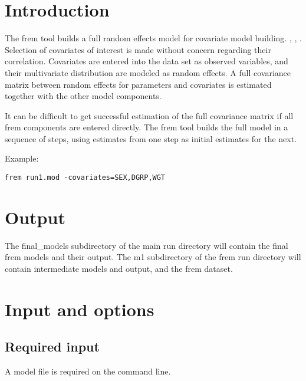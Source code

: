 
\usepackage{amsmath}


\newcommand{\guidetoolname}{frem}

\maketitle

\section{Introduction}
The frem tool builds a full random effects model for covariate model building. \cite{Karlsson}, \cite{Ivaturi}, \cite{Yun}.
Selection of covariates of interest is made without concern regarding their correlation.
Covariates are entered into the data set as observed variables, and their multivariate distribution are modeled
as random effects. A full covariance matrix between random effects for parameters and covariates is estimated
together with the other model components.

It can be difficult to get successful estimation of the full covariance matrix if all frem components are entered directly.
The frem tool builds the full model in a sequence of steps, using estimates from one step as initial estimates for the next.

Example:
\begin{verbatim}
frem run1.mod -covariates=SEX,DGRP,WGT
\end{verbatim}

\section{Output}
The final\_models subdirectory of the main run directory will contain the final frem models and their output.
The m1 subdirectory of the frem run directory will contain intermediate models and output, and the frem dataset.

\section{Input and options}
\subsection{Required input}
A model file is required on the command line.

